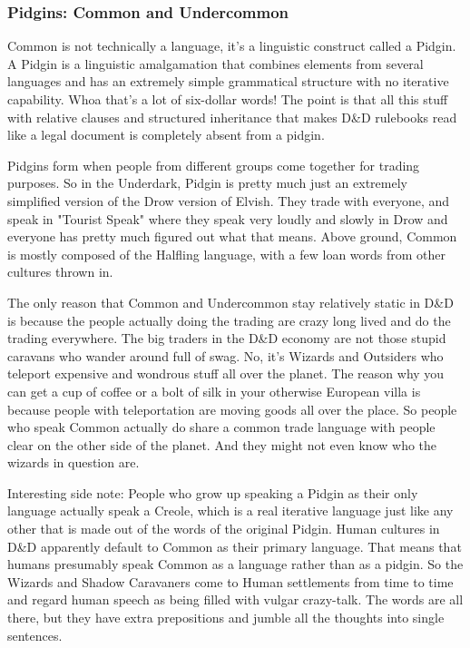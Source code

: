 \subsubsection{Pidgins: Common and Undercommon}
\vspace*{-8pt}

Common is not technically a language, it's a linguistic construct called a Pidgin. A Pidgin is a linguistic amalgamation that combines elements from several languages and has an extremely simple grammatical structure with no iterative capability. Whoa that's a lot of six-dollar words! The point is that all this stuff with relative clauses and structured inheritance that makes D\&D rulebooks read like a legal document is completely absent from a pidgin.

Pidgins form when people from different groups come together for trading purposes. So in the Underdark, Pidgin is pretty much just an extremely simplified version of the Drow version of Elvish. They trade with everyone, and speak in "Tourist Speak" where they speak very loudly and slowly in Drow and everyone has pretty much figured out what that means. Above ground, Common is mostly composed of the Halfling language, with a few loan words from other cultures thrown in.

The only reason that Common and Undercommon stay relatively static in D\&D is because the people actually doing the trading are crazy long lived and do the trading everywhere. The big traders in the D\&D economy are not those stupid caravans who wander around full of swag. No, it's Wizards and Outsiders who teleport expensive and wondrous stuff all over the planet. The reason why you can get a cup of coffee or a bolt of silk in your otherwise European villa is because people with teleportation are moving goods all over the place. So people who speak Common actually do share a common trade language with people clear on the other side of the planet. And they might not even know who the wizards in question are.

Interesting side note: People who grow up speaking a Pidgin as their only language actually speak a Creole, which is a real iterative language just like any other that is made out of the words of the original Pidgin. Human cultures in D\&D apparently default to Common as their primary language. That means that humans presumably speak Common as a language rather than as a pidgin. So the Wizards and Shadow Caravaners come to Human settlements from time to time and regard human speech as being filled with vulgar crazy-talk. The words are all there, but they have extra prepositions and jumble all the thoughts into single sentences.

